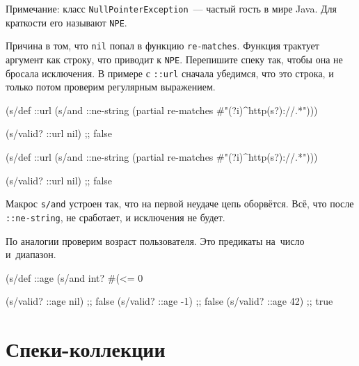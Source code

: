 
Примечание: класс \verb|NullPointerException|~--- частый гость в мире Java. Для
краткости его называют \verb|NPE|.

Причина в том, что \verb|nil| попал в функцию \verb|re-matches|. Функция
трактует аргумент как строку, что приводит к \verb|NPE|. Перепишите спеку так,
чтобы она не бросала исключения. В примере с \verb|::url| сначала убедимся,
что это строка, и только потом проверим регулярным выражением.

\ifx\DEVICETYPE\MOBILE

\begin{english}
  \begin{clojure}
(s/def ::url
  (s/and ::ne-string
         (partial re-matches
           #"(?i)^http(s?)://.*")))

(s/valid? ::url nil) ;; false
  \end{clojure}
\end{english}

\else

\begin{english}
  \begin{clojure}
(s/def ::url
  (s/and ::ne-string
         (partial re-matches #"(?i)^http(s?)://.*")))

(s/valid? ::url nil) ;; false
  \end{clojure}
\end{english}

\fi


Макрос \verb|s/and| устроен так, что на первой неудаче цепь
оборвётся. Всё, что после \verb|::ne-string|, не сработает, и
исключения не будет.

По аналогии проверим возраст пользователя. Это предикаты на~число и~диапазон.

\begin{english}
  \begin{clojure}
(s/def ::age
  (s/and int? #(<= 0 %

(s/valid? ::age nil) ;; false
(s/valid? ::age -1)  ;; false
(s/valid? ::age 42)  ;; true
  \end{clojure}
\end{english}

\section{Спеки-коллекции}


